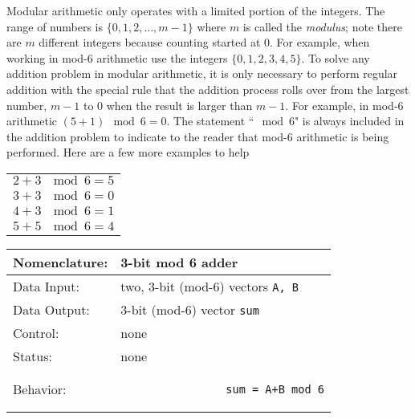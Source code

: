 \begin{enumerate}
                \label{page:mod}
                Modular arithmetic only operates with a limited portion of the
                integers.  The range of numbers is $\{0,1,2, \ldots ,m-1\}$ where
                $m$ is called the \textit{ modulus}; note there are $m$ different
                integers because counting started at 0.  For example, when working
                in mod-6 arithmetic use the integers $\{0,1,2,3,4,5\}$.
                To solve any addition problem in modular arithmetic, it is only
                necessary to perform regular addition with the special rule that
                the addition process rolls over from the largest number, $m-1$ to 0
                when the result is larger than $m-1$.  For
                example, in mod-6 arithmetic $(5+1) \mod 6 = 0$.  The statement
                ``$\mod 6$" is always included in the addition problem to indicate
                to the reader that mod-6 arithmetic is being performed.  Here
                are a few more examples to help

                \begin{tabular}{l}
                    $2+3~\mod 6 = 5$ \\
                    $3+3~\mod 6 = 0$ \\
                    $4+3~\mod 6 = 1$ \\
                    $5+5~\mod 6 = 4$
                \end{tabular}

                \label{page:modadder}
                \begin{tabular}{|l|p{3.5in}|} \hline
                    Nomenclature:  & 3-bit mod 6 adder                \\ \hline
                    Data Input:    & two, 3-bit (mod-6) vectors \verb+A, B+  \\ \hline
                    Data Output:   & 3-bit (mod-6) vector \verb+sum+    \\ \hline
                    Control:       & none                                   \\ \hline
                    Status:        & none                                   \\ \hline
                    Behavior:      &
                \begin{verbatim}
                sum = A+B mod 6
                \end{verbatim}
                    \\ \hline
                \end{tabular}


\end{enumerate}
